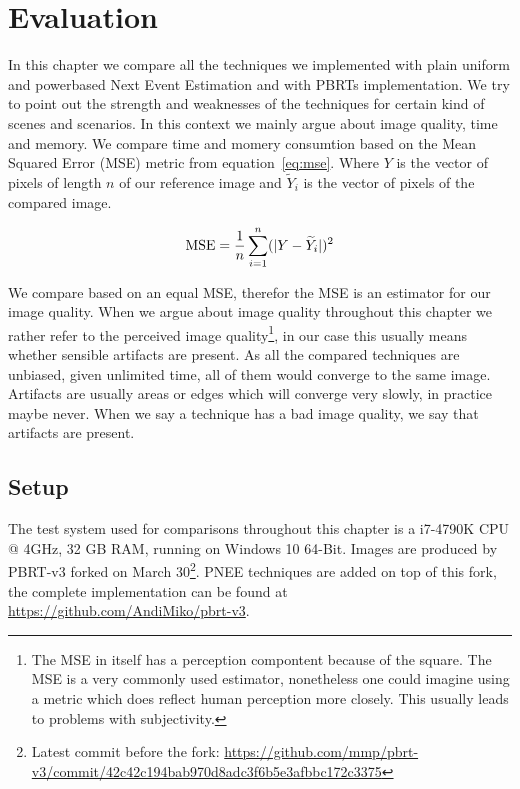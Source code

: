 \chapter{Evaluation}
\label{ch:Evaluation}
In this chapter we compare all the techniques we implemented with plain uniform and powerbased Next Event Estimation and with PBRTs implementation. We try to point out the strength and weaknesses of the techniques for certain kind of scenes and scenarios. In this context we mainly argue about image quality, time and memory. We compare time and momery consumtion based on the Mean Squared Error (MSE) metric from equation~\ref{eq:mse}. Where $Y$ is the vector of pixels of length $n$ of our reference image and $\widetilde{Y}_i$ is the vector of pixels of the compared image. 

\begin{align}\label{eq:mse}
\text{MSE} = \frac{1}{n}\sum_{i=1}^{n}(\lvert Y - \widetilde{Y}_i\rvert)^2
\end{align}


We compare based on an equal MSE, therefor the MSE is an estimator for our image quality. When we argue about image quality throughout this chapter we rather refer to the perceived image quality\footnote{The MSE in itself has a perception compontent because of the square. The MSE is a very commonly used estimator, nonetheless one could imagine using a metric which does reflect human perception more closely. This usually leads to problems with subjectivity.}, in our case this usually means whether sensible artifacts are present. As all the compared techniques are unbiased, given unlimited time, all of them would converge to the same image. Artifacts are usually areas or edges which will converge very slowly, in practice maybe never. When we say a technique has a bad image quality, we say that artifacts are present. 

\section{Setup}

The test system used for comparisons throughout this chapter is a i7-4790K CPU @ 4GHz, 32 GB RAM, running on Windows 10 64-Bit. Images are produced by PBRT-v3 forked on March 30\footnote{Latest commit before the fork: \url{https://github.com/mmp/pbrt-v3/commit/42c42c194bab970d8adc3f6b5e3afbbc172c3375}}. PNEE techniques are added on top of this fork, the complete implementation can be found at \url{https://github.com/AndiMiko/pbrt-v3}.

